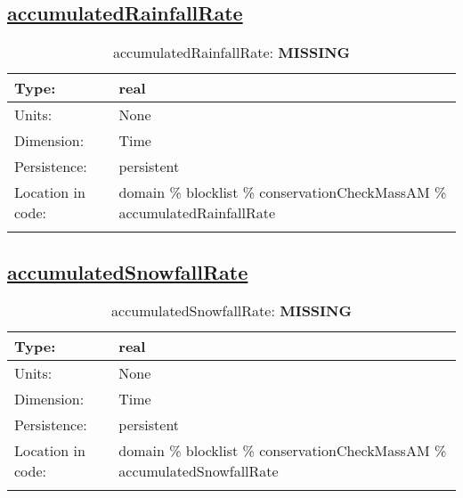 \subsection[accumulatedRainfallRate]{\hyperref[sec:var_tab_conservationCheckMassAM]{accumulatedRainfallRate}}
\label{subsec:var_sec_conservationCheckMassAM_accumulatedRainfallRate}
\begin{center}
\begin{longtable}{| p{2.0in} | p{4.0in} |}
        \hline 
        Type: & real \\
        \hline 
        Units: & \si{None} \\
        \hline 
        Dimension: & Time \\
        \hline 
        Persistence: & persistent \\
        \hline 
         Location in code: & domain \% blocklist \% conservationCheckMassAM \% accumulatedRainfallRate \\
         \hline 
    \caption{accumulatedRainfallRate: {\bf \color{red} MISSING}}
\end{longtable}
\end{center}
\subsection[accumulatedSnowfallRate]{\hyperref[sec:var_tab_conservationCheckMassAM]{accumulatedSnowfallRate}}
\label{subsec:var_sec_conservationCheckMassAM_accumulatedSnowfallRate}
\begin{center}
\begin{longtable}{| p{2.0in} | p{4.0in} |}
        \hline 
        Type: & real \\
        \hline 
        Units: & \si{None} \\
        \hline 
        Dimension: & Time \\
        \hline 
        Persistence: & persistent \\
        \hline 
         Location in code: & domain \% blocklist \% conservationCheckMassAM \% accumulatedSnowfallRate \\
         \hline 
    \caption{accumulatedSnowfallRate: {\bf \color{red} MISSING}}
\end{longtable}
\end{center}
